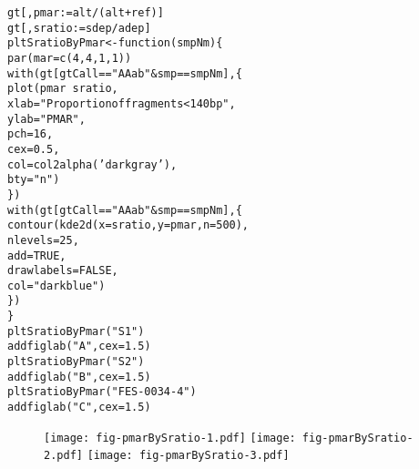 \documentclass{article}\usepackage[]{graphicx}\usepackage[]{color}
\makeatletter
\newcommand{\hlnum}[1]{\textcolor[rgb]{0.063,0.58,0.627}{#1}}%
\newcommand{\hlstr}[1]{\textcolor[rgb]{0.063,0.58,0.627}{#1}}%
\newcommand{\hlopt}[1]{\textcolor[rgb]{0.196,0.196,0.196}{#1}}%
\newcommand{\hlstd}[1]{\textcolor[rgb]{0.196,0.196,0.196}{#1}}%
\newcommand{\hlkwa}[1]{\textcolor[rgb]{0.231,0.416,0.784}{#1}}%
\newcommand{\hlkwb}[1]{\textcolor[rgb]{0.627,0,0.314}{#1}}%
\newcommand{\hlkwc}[1]{\textcolor[rgb]{0,0.631,0.314}{#1}}%
\newcommand{\hlkwd}[1]{\textcolor[rgb]{0.78,0.227,0.412}{#1}}%
\newenvironment{kframe}{%
 \def\at@end@of@kframe{}%
 \ifinner\ifhmode%
  \def\at@end@of@kframe{\end{minipage}}%
  \begin{minipage}{\columnwidth}%
 \fi\fi%
 \def\FrameCommand##1{\hskip\@totalleftmargin \hskip-\fboxsep
 \colorbox{shadecolor}{##1}\hskip-\fboxsep
     \hskip-\linewidth \hskip-\@totalleftmargin \hskip\columnwidth}%
 \MakeFramed {\advance\hsize-\width
   \@totalleftmargin\z@ \linewidth\hsize
   \@setminipage}}%
 {\par\unskip\endMakeFramed%
 \at@end@of@kframe}
\newenvironment{knitrout}{}{} %
\makeatother
\begin{document}
\begin{knitrout}
\color{fgcolor}\begin{kframe}
\begin{alltt}
\hlstd{gt[ , pmar} \hlkwb{:=} \hlstd{alt}\hlopt{/}\hlstd{(alt} \hlopt{+} \hlstd{ref)]}
\hlstd{gt[ , sratio} \hlkwb{:=} \hlstd{sdep}\hlopt{/}\hlstd{adep]}
\hlstd{pltSratioByPmar} \hlkwb{<-} \hlkwa{function}\hlstd{(}\hlkwc{smpNm}\hlstd{) \{}
  \hlkwd{par}\hlstd{(}\hlkwc{mar} \hlstd{=} \hlkwd{c}\hlstd{(}\hlnum{4}\hlstd{,} \hlnum{4}\hlstd{,} \hlnum{1}\hlstd{,} \hlnum{1}\hlstd{))}
  \hlkwd{with}\hlstd{(gt[gtCall} \hlopt{==} \hlstr{"AAab"} \hlopt{&} \hlstd{smp} \hlopt{==} \hlstd{smpNm], \{}
    \hlkwd{plot}\hlstd{(pmar} \hlopt{~} \hlstd{sratio,}
         \hlkwc{xlab} \hlstd{=} \hlstr{"Proportion of fragments < 140 bp"}\hlstd{,}
         \hlkwc{ylab} \hlstd{=} \hlstr{"PMAR"}\hlstd{,}
         \hlkwc{pch} \hlstd{=} \hlnum{16}\hlstd{,}
         \hlkwc{cex} \hlstd{=} \hlnum{0.5}\hlstd{,}
         \hlkwc{col} \hlstd{=} \hlkwd{col2alpha}\hlstd{(}\hlstr{'darkgray'}\hlstd{),}
         \hlkwc{bty} \hlstd{=} \hlstr{"n"}\hlstd{)}
  \hlstd{\})}
  \hlkwd{with}\hlstd{(gt[gtCall} \hlopt{==} \hlstr{"AAab"} \hlopt{&} \hlstd{smp} \hlopt{==} \hlstd{smpNm], \{}
    \hlkwd{contour}\hlstd{(}\hlkwd{kde2d}\hlstd{(}\hlkwc{x} \hlstd{= sratio,} \hlkwc{y} \hlstd{= pmar,} \hlkwc{n} \hlstd{=} \hlnum{500}\hlstd{),}
            \hlkwc{nlevels} \hlstd{=} \hlnum{25}\hlstd{,}
            \hlkwc{add} \hlstd{=} \hlnum{TRUE}\hlstd{,}
            \hlkwc{drawlabels} \hlstd{=} \hlnum{FALSE}\hlstd{,}
            \hlkwc{col} \hlstd{=} \hlstr{"darkblue"}\hlstd{)}
  \hlstd{\})}
\hlstd{\}}
\hlkwd{pltSratioByPmar}\hlstd{(}\hlstr{"S1"}\hlstd{)}
\hlkwd{addfiglab}\hlstd{(}\hlstr{"A"}\hlstd{,} \hlkwc{cex} \hlstd{=} \hlnum{1.5}\hlstd{)}
\hlkwd{pltSratioByPmar}\hlstd{(}\hlstr{"S2"}\hlstd{)}
\hlkwd{addfiglab}\hlstd{(}\hlstr{"B"}\hlstd{,} \hlkwc{cex} \hlstd{=} \hlnum{1.5}\hlstd{)}
\hlkwd{pltSratioByPmar}\hlstd{(}\hlstr{"FES-0034-4"}\hlstd{)}
\hlkwd{addfiglab}\hlstd{(}\hlstr{"C"}\hlstd{,} \hlkwc{cex} \hlstd{=} \hlnum{1.5}\hlstd{)}
\end{alltt}
\end{kframe}
\end{knitrout}

\begin{figure}
  \centering
  \texttt{[image: fig-pmarBySratio-1.pdf]}%
  \texttt{[image: fig-pmarBySratio-2.pdf]}%
  \texttt{[image: fig-pmarBySratio-3.pdf]}
\end{figure}
\end{document}
